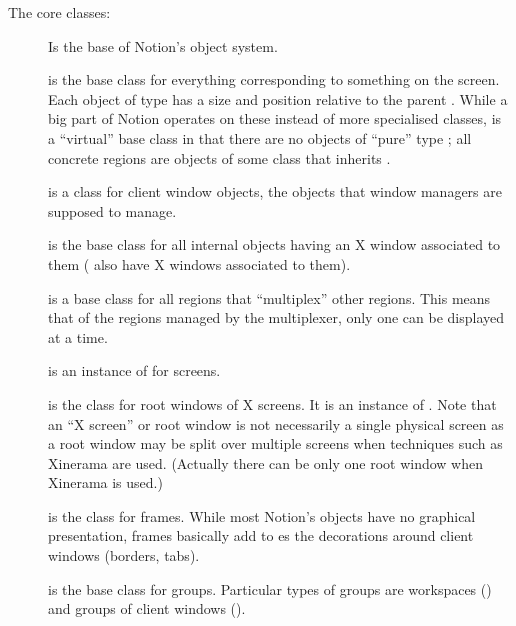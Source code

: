 The core classes:

\begin{description}
  \item[]
    Is the base of Notion's object system.

  \item[]
    is the base class for everything corresponding to something on the
    screen. Each object of type  has a size and  position
    relative to the parent . While a big part of Notion 
    operates on these instead of more specialised classes, 
    is a ``virtual''  base class in that there are no objects of ``pure''
    type ; all concrete regions are objects of some class 
    that inherits .

  \item[] is a class for
    client window objects, the objects that window managers are
    supposed to manage.

  \item[] is the base class for all
    internal objects having an X window associated to them
    ( also have X windows associated to them).
    
  \item[] is a base class for all regions that ``multiplex'' 
    other regions. This means that of the regions managed by the multiplexer,
    only one can be displayed at a time. 
  
  \item[] is an instance of 
    for screens.
    
  \item[] is the class for
    root windows of X screens.
    It is an instance of .
    Note that an ``X screen'' or root window is not necessarily a
    single physical screen as a root window
    may be split over multiple screens when techniques such as 
    Xinerama are used. (Actually there can be only 
    one root window when Xinerama is used.) 
    
  \item[] is the class for frames.
    While most Notion's objects have no graphical presentation, frames 
    basically add to es the decorations around client 
    windows (borders, tabs).
    
  \item[] is the base class for groups.
    Particular types of groups are workspaces 
    ()
    and groups of client windows
    ().
\end{description}


